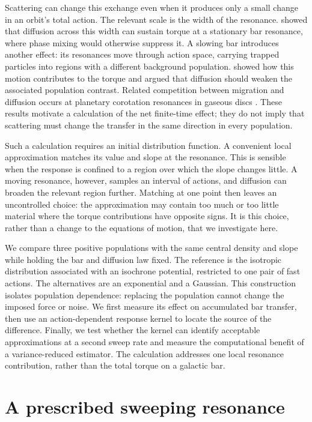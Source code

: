 \documentclass[fleqn,usenatbib]{mnras}
\begin{document}
Scattering can change this exchange even when it produces only a small change in an orbit's total action. The relevant scale is the width of the resonance. \citet{Hamilton2023} showed that diffusion across this width can sustain torque at a stationary bar resonance, where phase mixing would otherwise suppress it. A slowing bar introduces another effect: its resonances move through action space, carrying trapped particles into regions with a different background population. \citet{Chiba2023} showed how this motion contributes to the torque and argued that diffusion should weaken the associated population contrast. Related competition between migration and diffusion occurs at planetary corotation resonances in gaseous discs \citep{OgilvieLubow2006}. These results motivate a calculation of the net finite-time effect; they do not imply that scattering must change the transfer in the same direction in every population.

Such a calculation requires an initial distribution function. A convenient local approximation matches its value and slope at the resonance. This is sensible when the response is confined to a region over which the slope changes little. A moving resonance, however, samples an interval of actions, and diffusion can broaden the relevant region further. Matching at one point then leaves an uncontrolled choice: the approximation may contain too much or too little material where the torque contributions have opposite signs. It is this choice, rather than a change to the equations of motion, that we investigate here.

We compare three positive populations with the same central density and slope while holding the bar and diffusion law fixed. The reference is the isotropic distribution associated with an isochrone potential, restricted to one pair of fast actions. The alternatives are an exponential and a Gaussian. This construction isolates population dependence: replacing the population cannot change the imposed force or noise. We first measure its effect on accumulated bar transfer, then use an action-dependent response kernel to locate the source of the difference. Finally, we test whether the kernel can identify acceptable approximations at a second sweep rate and measure the computational benefit of a variance-reduced estimator. The calculation addresses one local resonance contribution, rather than the total torque on a galactic bar.

\section{A prescribed sweeping resonance}\label{model}
\end{document}
